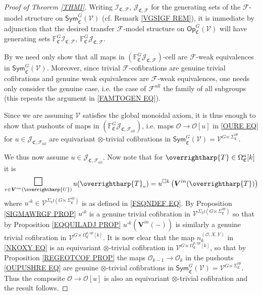\documentclass[a4paper,10pt
,draft
]{article}%
\numberwithin{equation}{section}
\numberwithin{figure}{section}
\theoremstyle{definition} %
\newcommand{\vect}[1]{\text{\overrightharp{\ensuremath{#1}}}}
\newcommand{\F}{\ensuremath{\mathcal F}}
\newcommand{\V}{\ensuremath{\mathcal V}}
\renewcommand{\O}{\ensuremath{\mathcal O}}
\newcommand{\1}{\ensuremath{\mathbbm 1}}%
\begin{document}
\begin{proof}[Proof of Theorem \ref{THMI}]    
Writing
$\mathcal{I}_{\mathfrak{C},\mathcal{F}}$,
$\mathcal{J}_{\mathfrak{C},\mathcal{F}}$
for the generating sets
of the $\F$-model structure on 
$\mathsf{Sym}^G_{\mathfrak{C}}(\V)$
(cf. Remark \ref{VGSIGF REM}),
it is immediate by adjunction
that the desired transfer $\F$-model structure
on $\mathsf{Op}^G_{\mathfrak{C}}(\V)$
will have generating sets 
$\mathbb{F}^G_{\mathfrak{C}}\mathcal{I}_{\mathfrak{C},\mathcal{F}}$,
$\mathbb{F}^G_{\mathfrak{C}}\mathcal{J}_{\mathfrak{C},\mathcal{F}}$.
	 
By \cite[Thm. 11.3.2]{Hir03} we need only show that
all maps in
$(\mathbb{F}^G_{\mathfrak{C}}\mathcal{J}_{\mathfrak{C},\mathcal{F}})$-cell
are $\F$-weak equivalences in $\mathsf{Sym}^G_{\mathfrak{C}}(\V)$.
Moreover, since trivial $\F$-cofibrations are genuine trivial cofibrations and 
genuine weak equivalences are $\F$-weak equivalences, one needs only consider the genuine case, i.e. the case of $\F^{all}$ the family of all subgroups (this repeats the argument in \eqref{FAMTOGEN EQ}).


Since we are assuming $\V$ satisfies the global monoidal axiom, 
it is thus enough to show that pushouts of maps in 
$(\mathbb{F}^G_{\mathfrak{C}}\mathcal{J}_{\mathfrak{C},\mathcal{F}_{all}})$,
i.e. maps $\O \to \O[u]$ in \eqref{OURE EQ}
for $u \in \mathcal{J}_{\mathfrak{C},\mathcal{F}_{all}}$
are equivariant $\otimes$-trivial cofibrations
in $\mathsf{Sym}^G_{\mathfrak{C}}(\V) = \V^{G \ltimes \Sigma^{op}_{\mathfrak{C}}}$.



We thus now assume $u \in \mathcal{J}_{\mathfrak{C},\mathcal{F}_{all}}$.
Now note that for $\vect{T} \in \Omega^a_{\mathfrak{C}}[k]$
it is
\[
	\mathop{\mathlarger{\mathlarger{\mathlarger{\square}}}}\limits_{v \in \boldsymbol{V}^{in}(\vect{U})} u(\vect{T}_v)
=
	u^{\square k}\left( \boldsymbol{V}^{in}(\vect T) \right)
\]
where
$u^{\square k} \in 
\V^{\Sigma_k \wr (G \ltimes \Sigma^{op}_{\mathfrak{C}})}$
is as defined in \eqref{FSQNDEF EQ}.
By Proposition \ref{SIGMAWRGF PROP}
$u^{\square k}$ is a genuine trivial cofibration in 
$\V^{\Sigma_k \wr (G \ltimes \Sigma^{op}_{\mathfrak{C}})}$
so that by
Proposition \ref{EQQUILADJ PROP}
$u^{\square k}(\boldsymbol{V}^{in}(-))$
is similarly a genuine trivial cofibration in 
$\V^{G \ltimes \Omega^{a,op}_{\mathfrak{C}}[k]}$.
It is now clear that
the map $n_k^{(\O,X,Y)}$ in \eqref{NKOXY EQ}
is an equivariant
$\otimes$-trivial cofibration in 
$\V^{G \ltimes \Omega^{a,op}_{\mathfrak{C}}[k]}$,
so that by 
Proposition \ref{REGEOTCOF PROP}
the maps $\O_{k-1} \to \O_{k}$
in the pushouts \eqref{OUPUSHRE EQ}
are genuine $\otimes$-trivial cofibrations
in 
$\mathsf{Sym}^G_{\mathfrak{C}}(\V)
= \V^{G\ltimes \Sigma^{op}_{\mathfrak{C}}}$.
Thus the composite $\O \to \O[u]$
is also an
equivariant $\otimes$-trivial cofibration
and the result follows.
\end{proof}
\end{document}
